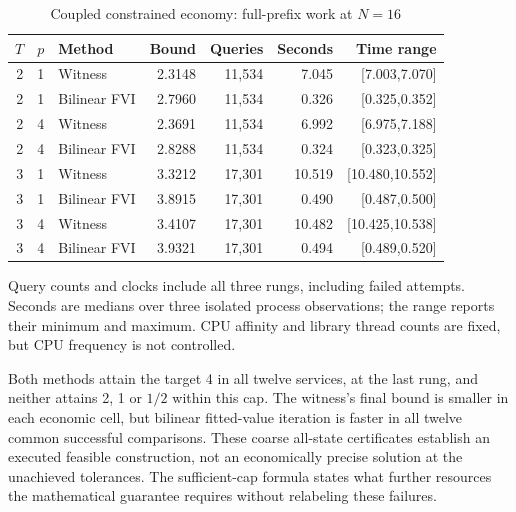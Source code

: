 \begin{table}[htbp]\centering
\caption{Coupled constrained economy: full-prefix work at $N=16$}\label{tab:constrained47}
\begin{tabular}{rrlrrrr}\toprule
$T$ & $p$ & Method & Bound & Queries & Seconds & Time range\\\midrule
2 & 1 & Witness & 2.3148 & 11,534 & 7.045 & [7.003,7.070] \\
2 & 1 & Bilinear FVI & 2.7960 & 11,534 & 0.326 & [0.325,0.352] \\
2 & 4 & Witness & 2.3691 & 11,534 & 6.992 & [6.975,7.188] \\
2 & 4 & Bilinear FVI & 2.8288 & 11,534 & 0.324 & [0.323,0.325] \\
3 & 1 & Witness & 3.3212 & 17,301 & 10.519 & [10.480,10.552] \\
3 & 1 & Bilinear FVI & 3.8915 & 17,301 & 0.490 & [0.487,0.500] \\
3 & 4 & Witness & 3.4107 & 17,301 & 10.482 & [10.425,10.538] \\
3 & 4 & Bilinear FVI & 3.9321 & 17,301 & 0.494 & [0.489,0.520] \\
\bottomrule\end{tabular}
\par\smallskip\begin{minipage}{0.98\linewidth}\footnotesize Query counts and clocks include all three rungs, including failed attempts. Seconds are medians over three isolated process observations; the range reports their minimum and maximum. CPU affinity and library thread counts are fixed, but CPU frequency is not controlled.\end{minipage}\end{table}

Both methods attain the target 4 in all twelve services, at the last rung, and neither attains 2, 1 or $1/2$ within this cap. The witness's final bound is smaller in each economic cell, but bilinear fitted-value iteration is faster in all twelve common successful comparisons. These coarse all-state certificates establish an executed feasible construction, not an economically precise solution at the unachieved tolerances. The sufficient-cap formula states what further resources the mathematical guarantee requires without relabeling these failures.
